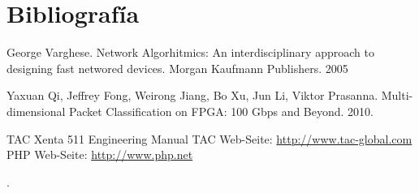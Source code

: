 \chapter{Bibliografía}
\begin{thebibliography}{10}
 George Varghese. Network Algorhitmics: An interdisciplinary approach to designing fast networed devices. Morgan Kaufmann Publishers. 2005 

Yaxuan Qi, Jeffrey Fong, Weirong Jiang, Bo Xu, Jun Li, Viktor Prasanna. Multi-dimensional Packet Classification on FPGA: 100 Gbps and Beyond. 2010.


 TAC Xenta 511 Engineering Manual
 TAC Web-Seite: \url{http://www.tac-global.com}
 PHP Web-Seite: \url{http://www.php.net}
\end{thebibliography}.
